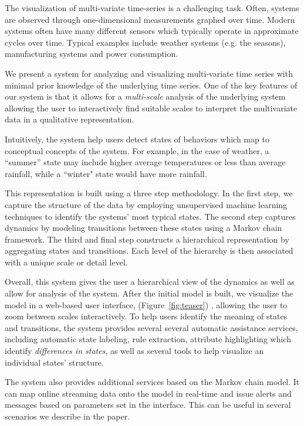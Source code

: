 The visualization of multi-variate time-series is a challenging task. Often, systems are observed through one-dimensional measurements graphed over time. Modern systems often have many different sensors which 
typically operate in approximate cycles over time. Typical examples include weather systems (e.g. the seasons), manufacturing systems and power consumption. 

We present a system for analyzing and visualizing multi-variate time series with minimal prior knowledge of the underlying time series. One of the key features of our system is that it allows for a \emph{multi-scale} analysis of the underlying system allowing the user to interactively find suitable scales to interpret the multivariate data in a qualitative representation.  

Intuitively, the system help users detect states of behaviors which map to conceptual concepts of the system. For example, in the case of weather, a ``summer'' state may include higher average temperatures or less than average rainfall, while a ``winter" state would have more rainfall. 

This representation is built using a three step methodology. In the first
step, we capture the structure of the data by employing unsupervised machine learning
techniques to identify the systems' most typical states. The second step captures
dynamics by modeling transitions between these states using a Markov chain framework.
The third and final step constructs a hierarchical representation by aggregating
states and transitions. Each level of the hierarchy is then associated with a unique
scale or detail level.

Overall, this system gives the user a hierarchical view of the dynamics as well as 
allow for analysis of the system. After the initial model is built, we visualize the model
in a web-based user interface, (Figure~\ref{fig:teaser}) , allowing the 
user to zoom between scales interactively. To help users identify the
meaning of states and transitions, the system provides several several automatic assistance services,
including automatic state labeling, rule extraction, attribute highlighting which
identify \emph{differences in states}, as well as several tools to help visualize an individual states'
structure. 

The system also provides additional services based on the Markov chain model. It can map online streaming data onto 
the model in real-time and issue alerts and messages based on parameters set in the interface. This can be useful in several scenarios we describe in the paper.

